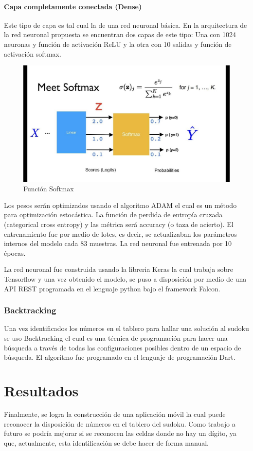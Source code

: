 \documentclass{article}
\begin{document}
\paragraph{Capa completamente conectada (Dense)} Este tipo de capa es tal cual la de una red neuronal b\'asica. En la arquitectura de la red neuronal propuesta se encuentran dos capas de este tipo: Una con 1024 neuronas y funci\'on de activaci\'on ReLU y la otra con 10 salidas y funci\'on de activaci\'on softmax.
\begin{figure}[H]
  \caption{Funci\'on Softmax}
  \centering 
  \includegraphics[scale=.30]{softmax}
\end{figure}

Los pesos ser\'an optimizados usando el algoritmo ADAM el cual es un m\'etodo para optimizaci\'on estoc\'astica. La funci\'on de perdida de entrop\'ia cruzada (categorical cross entropy) y las m\'etrica ser\'a accuracy (o taza de acierto).
El entrenamiento fue por medio de lotes, es decir, se actualizaban los par\'ametros internos del modelo cada 83 muestras. La red neuronal fue entrenada por 10 \'epocas.

La red neuronal fue construida usando la libreria Keras la cual trabaja sobre Tensorflow y una vez obtenido el modelo, se puso a disposici\'on por medio de una API REST programada en el lenguaje python bajo el framework Falcon.
\subsubsection{Backtracking}
Una vez identificados los n\'umeros en el tablero para hallar una soluci\'on al sudoku se uso Backtracking el cual es una t\'ecnica de programaci\'on para hacer una b\'usqueda a trav\'es de todas las configuraciones posibles dentro de un espacio de b\'usqueda.
El algoritmo fue programado en el lenguaje de programaci\'on Dart.
\section{Resultados}
Finalmente, se logra la construcci\'on de una aplicaci\'on m\'ovil la cual puede reconocer la disposici\'on de n\'umeros en el tablero del sudoku.
Como trabajo a futuro se podr\'ia mejorar  si se reconocen las celdas donde no hay un d\'igito, ya que, actualmente, esta identificaci\'on se debe hacer de forma manual.


    
\end{document}
